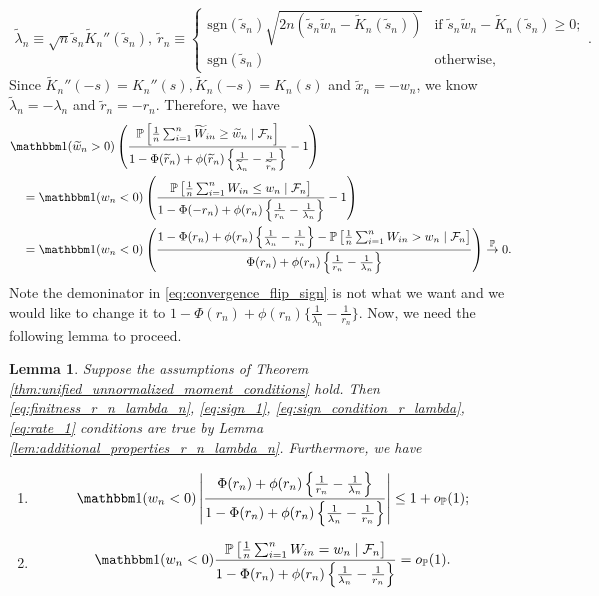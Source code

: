 \documentclass[12pt]{article}
\newtheorem{lemma}{Lemma}
\theoremstyle{definition}
\def\P{\mathbb{P}}
\def\sgn{\mathrm{sgn}}
\def\P{\mathbb{P}}
\renewcommand{\P}{\mathbb{P}}							%
\newcommand{\indicator}{\mathbbm 1}						%
\newcommand{\convp}{\overset{\mathbb{P}}{\rightarrow}}             %
\begin{document}
\begin{align*}
	\widetilde{\lambda}_n\equiv \sqrt{n}\widetilde{s}_n\widetilde{K}_n''(\widetilde{s}_n),\ \widetilde{r}_n\equiv 
	\begin{cases}
		\sgn(\widetilde s_n) \sqrt{2n( \widetilde s_n \widetilde w_n - \widetilde K_n(\widetilde s_n))} & \text{if } \widetilde s_n \widetilde w_n - \widetilde K_n(\widetilde s_n)\geq 0;\\
		\mathrm{sgn}(\widetilde s_n) & \text{otherwise},
	  \end{cases}.
\end{align*}
Since $\widetilde{K}_n''(-s)=K_n''(s),\widetilde{K}_n(-s)=K_n(s)$ and $\widetilde{x}_n=-w_n$, we know $\widetilde{\lambda}_n=-\lambda_n$ and $\widetilde{r}_n=-r_n$. Therefore, we have
\begin{align}
&\nonumber
\indicator(\widetilde w_n > 0)\left(\frac{\P\left[\frac1n \sum_{i = 1}^n \widetilde W_{in} \geq \widetilde w_n \mid \mathcal F_n\right]}{1-\Phi(\widetilde r_n)+\phi(\widetilde r_n)\left\{\frac{1}{\widetilde \lambda_n}-\frac{1}{\widetilde r_n}\right\}}-1\right) \\
&\nonumber
\quad = \indicator(w_n < 0)\left(\frac{\P\left[\frac1n \sum_{i = 1}^n W_{in} \leq w_n \mid \mathcal F_n\right]}{1-\Phi(-r_n)+\phi(r_n)\left\{\frac{1}{r_n}-\frac{1}{\lambda_n}\right\}}-1\right) \\
&\label{eq:convergence_flip_sign}
\quad = \indicator(w_n < 0)\left(\frac{1 - \Phi(r_n)+\phi(r_n)\left\{\frac{1}{\lambda_n}-\frac{1}{r_n}\right\} - \P\left[\frac1n \sum_{i = 1}^n W_{in} > w_n \mid \mathcal F_n\right]}{\Phi(r_n)+\phi(r_n)\left\{\frac{1}{r_n}-\frac{1}{\lambda_n}\right\}}\right) \convp 0. 
\end{align}
Note the demoninator in \eqref{eq:convergence_flip_sign} is not what we want and we would like to change it to $1-\Phi(r_n)+\phi(r_n)\{\frac{1}{\lambda_n}-\frac{1}{r_n}\}$. Now, we need the following lemma to proceed.
\begin{lemma}\label{lem:upper_bound_ratio_spa}
	Suppose the assumptions of Theorem \ref{thm:unified_unnormalized_moment_conditions} hold. Then \eqref{eq:finitness_r_n_lambda_n}, \eqref{eq:sign_1}, \eqref{eq:sign_condition_r_lambda}, \eqref{eq:rate_1} conditions are true by Lemma \ref{lem:additional_properties_r_n_lambda_n}. Furthermore, we have 
	\begin{enumerate}
		\item 	
		\begin{align}\label{eq:multiplication-flip-sign}
			\indicator(w_n<0)\left|\frac{\Phi(r_n)+\phi(r_n)\left\{\frac{1}{r_n}-\frac{1}{\lambda_n}\right\}}{1 - \Phi(r_n)+\phi(r_n)\left\{\frac{1}{\lambda_n}-\frac{1}{r_n}\right\}}\right|\leq 1+o_\P(1);
		\end{align}
		\item 
		\begin{align}\label{eq:equality-corner-case}
			\indicator(w_n < 0)\frac{\P\left[\frac1n \sum_{i = 1}^n W_{in} = w_n \mid \mathcal F_n\right]}{1-\Phi(r_n)+\phi(r_n)\left\{\frac{1}{\lambda_n}-\frac{1}{r_n}\right\}}=o_\P(1).
		\end{align}
	\end{enumerate}
\end{lemma}
\end{document}
